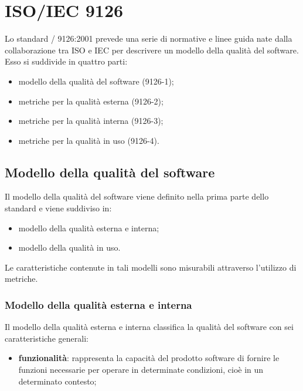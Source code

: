 
{
\newcommand{\qmodel}{modello della qualità del software}
\newcommand{\qeimodel}{modello della qualità esterna e interna}
\newcommand{\qumodel}{modello della qualità in uso}
\newcommand{\Qmodel}{Modello della qualità del software}
\newcommand{\Qeimodel}{Modello della qualità esterna e interna}
\newcommand{\Qumodel}{Modello della qualità in uso}
\newcommand{\rappr}{rappresenta la capacità del prodotto software}

\section{ISO/IEC 9126}

Lo standard / 9126:2001 prevede una serie di normative e linee guida nate dalla collaborazione tra ISO e IEC per descrivere un modello della qualità del software. \\
Esso si suddivide in quattro parti:
	\begin{itemize}	
		\item modello della qualità del software (9126-1);
		\item metriche per la qualità esterna (9126-2);
		\item metriche per la qualità interna (9126-3);
		\item metriche per la qualità in uso (9126-4).
	\end{itemize}

\subsection{\Qmodel}
	Il {\qmodel} viene definito nella prima parte dello standard e viene suddiviso in:
	\begin{itemize}
		\item \qeimodel;
		\item \qumodel.
	\end{itemize}
	Le caratteristiche contenute in tali modelli sono misurabili attraverso l'utilizzo di metriche. \\
	
\subsubsection{\Qeimodel}
	Il {\qeimodel} classifica la qualità del software con sei caratteristiche generali:
	\begin{itemize}
		\item \textbf{funzionalità}: {\rappr} di fornire le funzioni necessarie per operare in determinate condizioni, cioè in un determinato contesto;
		

\end{itemize}}

